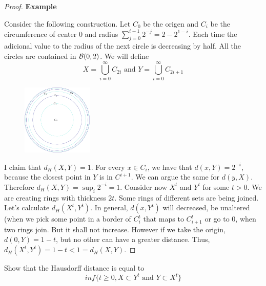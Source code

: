 \begin{proof}
\textbf{Example}

Consider the following construction. Let $C_0$ be the origen and $C_i$ be the
circumference of center 0 and radius $\sum_{j=0}^{i-1} 2^{-j} = 2 - 2^{1-i}$.
Each time the adicional value to the radius of the next circle is decreasing
by half. All the circles are contained in $\mathcal{B}(0,2)$. We will define $$X =
\bigcup_{i=0}^{\infty} C_{2i} \text{ and } Y =
\bigcup_{i=0}^{\infty} C_{2i + 1}$$

\begin{figure}[H]
    \centering
    \includegraphics[width = 0.3\textwidth]{../images/circle-inside-circle.png}
\end{figure}

I claim that $d_H(X,Y) = 1$. For every $x \in C_i$, we have that $d(x,Y) =
2^{-i}$, because the closest point in $Y$ is in $C^{i+1}$. We can argue the
same for $d(y,X)$. Therefore $d_H(X,Y) = \sup_i 2^{-i} = 1$. Consider now
$X^t$ and $Y^t$ for some $t > 0$. We are creating rings with thickness $2t$.
Some rings of different sets are being joined. Let's calculate $d_H(X^t,
Y^t)$. In general, $d(x,Y^t)$ will decreased, be unaltered (when we pick some
point in a border of $C_i^t$ that maps to $C_{i+1}^t$ or go to $0$, when two
rings join. But it shall not increase. However if we take the origin, $d(0,Y)
= 1 - t$, but no other can have a greater distance. Thus, $d_H(X^t, Y^t) = 1-t
< 1 = d_H(X, Y)$. 

\end{proof}

\noindent\linia

\begin{exercise}
    Show that the Hausdorff distance is equal to
    $$inf\{t \ge 0, X \subset Y^t \text{ and } Y \subset X^t\}$$
\end{exercise}

